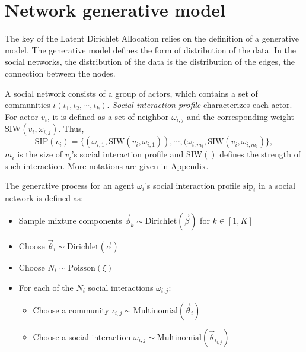 \documentclass[letterpaper]{article}
\begin{document}
\section{Network generative model}

The key of the Latent Dirichlet Allocation relies on the definition of a generative model.
The generative model defines the form of distribution of the data.
In the social networks, the distribution of the data is the distribution of the edges, the connection between the nodes.

A social network consists of a group of actors, which contains a set of communities $ \iota( \iota_{1} , \iota_{2} , \cdots , \iota_{k} ) $.
\emph{Social interaction profile} characterizes each actor.
For actor $ v_{i} $, it is defined as a set of neighbor $ \omega_{i,j} $ and the corresponding weight $ \mbox{SIW}(v_{i}, \omega_{i,j}) $.
Thus,
\begin{equation}
\mbox{SIP}(v_{i}) = \{ (\omega_{i,1}, \mbox{SIW}(v_{i}, \omega_{i,1})) , \cdots , (\omega_{i,m_{i}}, \mbox{SIW}(v_{i}, \omega_{i,m_{i}}) \},
\end{equation}
$ m_{i} $ is the size of $ v_{i} $'s social interaction profile and $ \mbox{SIW}() $ defines the strength of such interaction.
More notations are given in Appendix.

The generative process for an agent $ \omega_{i} $'s social interaction profile $ \mbox{sip}_{i} $ in a social network is defined as:
\begin{itemize}
	\item Sample mixture components $ \vec{\phi}_{k} \sim \mbox{Dirichlet}(\vec{\beta}) $ for $ k \in [1, K] $
	\item Choose $ \vec{\theta}_{i} \sim \mbox{Dirichlet}(\vec{\alpha}) $ 
	\item Choose $ N_{i}  \sim \mbox{Poisson}(\xi) $
	\item For each of the $ N_{i} $ social interactions $ \omega_{i,j} $:
	\begin{itemize}
		\item Choose a community $ \iota_{i,j} \sim \mbox{Multinomial}( \vec{\theta}_{i} ) $
		\item Choose a social interaction $ \omega_{i,j} \sim \mbox{Multinomial}( \vec{\theta}_{\iota_{i,j}} ) $	
	\end{itemize}
\end{itemize}
\end{document}
